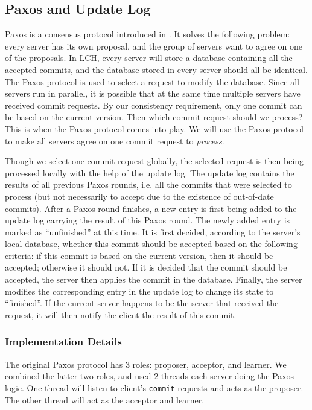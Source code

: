 \documentclass[11pt]{article}
\begin{document}
\subsection{Paxos and Update Log}
\label{sec:paxos}
Paxos is a consensus protocol introduced in \cite{paxos}.
It solves the following problem:
every server has its own proposal, and the group of servers want to agree on one of the proposals.
In LCH, every server will store a database containing all the accepted commits, and the database stored in every server should all be identical.
The Paxos protocol is used to select a request to modify the database.
Since all servers run in parallel, it is possible that at the same time multiple servers have received commit requests.
By our consistency requirement, only one commit can be based on the current version.
Then which commit request should we process?
This is when the Paxos protocol comes into play.
We will use the Paxos protocol to make all servers agree on one commit request to \emph{process}.

Though we select one commit request globally, the selected request is then being processed locally with the help of the update log.
The update log contains the results of all previous Paxos rounds, i.e. all the commits that were selected to process (but not necessarily to accept due to the existence of out-of-date commits).
After a Paxos round finishes, a new entry is first being added to the update log carrying the result of this Paxos round.
The newly added entry is marked as ``unfinished'' at this time.
It is first decided, according to the server's local database, whether this commit should be accepted based on the following criteria: if this commit is based on the current version, then it should be accepted; otherwise it should not.
If it is decided that the commit should be accepted, the server then applies the commit in the database.
Finally, the server modifies the corresponding entry in the update log to change its state to ``finished''.
If the current server happens to be the server that received the request, it will then notify the client the result of this commit.

\subsubsection{Implementation Details}
The original Paxos protocol has $3$ roles: proposer, acceptor, and learner.
We combined the latter two roles, and used $2$ threads each server doing the Paxos logic.
One thread will listen to client's \texttt{commit} requests and acts as the proposer.
The other thread will act as the acceptor and learner.
\end{document}
